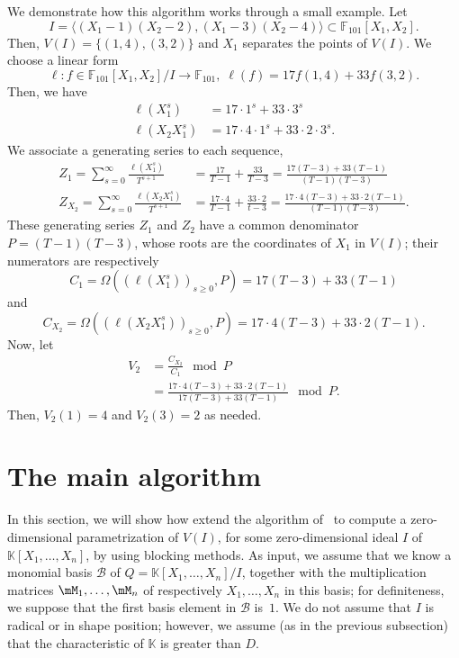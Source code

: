 \documentclass[12pt]{article}
\newcommand{\basis}{\mathscr{B}}
\newcommand{\minpoly}{P}
\def\F {\ensuremath{\mathbb{F}}}
\def\K{\mathbb{K}}
\def\K {\ensuremath{\mathbb{K}}}
\begin{document}
We demonstrate how this algorithm works through a small example. Let 
$$I = \langle (X_1-1)(X_2-2),(X_1-3)(X_2-4)\rangle \subset
\F_{101}[X_1,X_2].$$ Then, $V(I) = \{ (1,4),(3,2) \}$ and $X_1$ separates the
points of $V(I)$. We choose a  linear form 
$$\ell: f \in \F_{101}[X_1,X_2]/I \to \F_{101},\;\ell(f) = 17 f(1,4) + 33 f(3,2).$$
Then, we have
\begin{align*}
\ell(X_1^s) &= 17 \cdot 1^s + 33 \cdot 3^s\\
\ell(X_2X_1^s) &= 17 \cdot 4 \cdot 1^s + 33 \cdot 2 \cdot 3^s.
\end{align*} 
We associate a generating series to each sequence,
\begin{align*}
Z_1 = \sum_{s = 0}^{\infty} \frac{\ell(X^s_1)}{T^{s+1}}
&= \frac{17}{T-1} + \frac{33}{T-3}
= \frac{17(T-3)+33(T-1)}{(T-1)(T-3)} \\
Z_{X_2} = \sum_{s=0}^{\infty} \frac{\ell(X_2X_1^s)}{T^{s+1} }
&= \frac{17\cdot 4}{T-1} + \frac{33 \cdot 2}{t-3}
= \frac{17\cdot 4 (T-3) + 33\cdot 2(T-1)}{(T-1)(T-3)}.
\end{align*}
These generating series $Z_1$ and $Z_2$ have a common denominator $\minpoly = (T-1)(T-3)$,
whose roots are the coordinates of $X_1$ in $V(I)$;
their numerators are respectively
$$C_{1} = \Omega((\ell(X^s_1))_{s\ge 0},\minpoly) = 17 (T-3) + 33(T-1)$$
and
$$C_{X_2} = \Omega((\ell(X_2X^s_1))_{s\ge 0},\minpoly) = 17\cdot 4 (T-3) + 33\cdot 2(T-1).$$
Now, let
\begin{align*}
V_2 
&=\frac{C_{X_2}}{C_1} \mod \minpoly\\
&=\frac{17\cdot 4 (T-3) + 33\cdot 2(T-1)}{17(T-3)+33(T-1)} \mod \minpoly.
\end{align*}
Then, $ V_2(1) = 4$ and $V_2(3) = 2$ as needed.



\section{The main algorithm}

In this section, we will show how extend the algorithm
of~\cite{BoSaSc03} to compute a zero-dimensional parametrization of
$V(I)$, for some zero-dimensional ideal $I$ of $\K[X_1,\dots,X_n]$, by
using blocking methods. As input, we assume that we know a monomial
basis $\basis$ of $Q=\K[X_1,\dots,X_n]/I$, together with the
multiplication matrices $\mM_1,\dots,\mM_n$ of respectively
$X_1,\dots,X_n$ in this basis; for definiteness, we suppose that the
first basis element in $\basis$ is~$1$. We do not assume that $I$ is
radical or in shape position; however, we assume (as in the previous
subsection) that the characteristic of $\K$ is greater than $D$.
\end{document}
